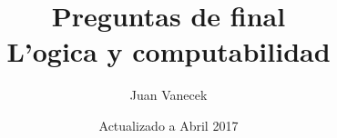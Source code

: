 \documentclass{exam}
\begin{document}
\title{Preguntas de final \\  L'ogica y computabilidad}
\author{Juan Vanecek}
\date{Actualizado a Abril 2017}
\begin{titlepage}
 \maketitle
\end{titlepage}




\newpage


\end{document}
